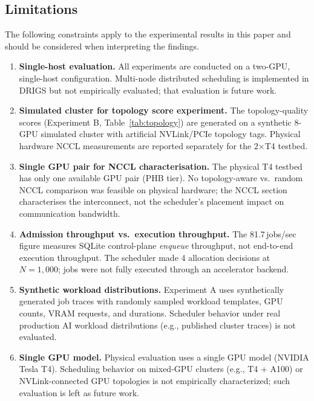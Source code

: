 \subsection*{Limitations}
The following constraints apply to the experimental results in this paper and should be considered when interpreting the findings.
\begin{enumerate}
    \item \textbf{Single-host evaluation.} All experiments are conducted on a two-GPU, single-host configuration. Multi-node distributed scheduling is implemented in DRIGS but not empirically evaluated; that evaluation is future work.
    \item \textbf{Simulated cluster for topology score experiment.} The topology-quality scores (Experiment B, Table~\ref{tab:topology}) are generated on a synthetic 8-GPU simulated cluster with artificial NVLink/PCIe topology tags. Physical hardware NCCL measurements are reported separately for the 2$\times$T4 testbed.
    \item \textbf{Single GPU pair for NCCL characterisation.} The physical T4 testbed has only one available GPU pair (PHB tier). No topology-aware vs.\ random NCCL comparison was feasible on physical hardware; the NCCL section characterises the interconnect, not the scheduler's placement impact on communication bandwidth.
    \item \textbf{Admission throughput vs.\ execution throughput.} The 81.7\,jobs/sec figure measures SQLite control-plane \emph{enqueue} throughput, not end-to-end execution throughput. The scheduler made 4 allocation decisions at $N=1{,}000$; jobs were not fully executed through an accelerator backend.
    \item \textbf{Synthetic workload distributions.} Experiment A uses synthetically generated job traces with randomly sampled workload templates, GPU counts, VRAM requests, and durations. Scheduler behavior under real production AI workload distributions (e.g., published cluster traces) is not evaluated.
    \item \textbf{Single GPU model.} Physical evaluation uses a single GPU model (NVIDIA Tesla T4). Scheduling behavior on mixed-GPU clusters (e.g., T4 + A100) or NVLink-connected GPU topologies is not empirically characterized; such evaluation is left as future work.
\end{enumerate}

